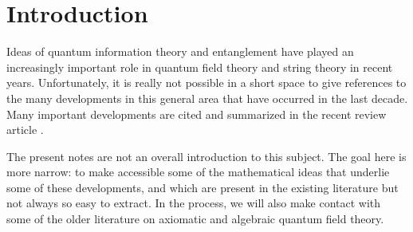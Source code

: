 \documentclass[12pt]{article}
\numberwithin{equation}{section}
\def\d{\mathrm d}
\def\A{{\mathcal A}}
\begin{document}
\def\Hom{\mathrm{Hom}}
\def\H{{\mathcal H}}
\def\d{{\mathrm d}}
\def\t{\widetilde}
\def\U{{\mathcal U}}
\def\UU{{\mathrm U}}
\def\V{{\mathcal V}}
\def\st{{\sf t}}
\def\O{{\mathcal O}}
\def\i{{\mathrm i}}
\def\A{{\mathcal A}}
\def\be{\begin{equation}}
\def\ee{\end{equation}}


\tableofcontents

\newpage

\section{Introduction}

Ideas of quantum information theory and entanglement have played an increasingly important role in quantum field theory
and string theory in recent years. Unfortunately, it is really not possible in a short space to give references to the many developments in this general area that
have occurred in the last decade.  Many important developments are cited and summarized in the recent review article
\cite{Nishioka}.  

The present notes are not an overall introduction to this subject.  The goal here is more narrow: to make accessible some of the mathematical
ideas that underlie some of these developments, and which are present in the existing literature but not always so easy to extract.  
In the process, we will also make contact with some of the older literature on axiomatic and algebraic quantum field theory.
\end{document}
